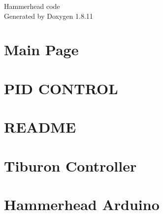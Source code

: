 \documentclass[twoside]{book}
\newcommand{\+}{\discretionary{\mbox{\scriptsize$\hookleftarrow$}}{}{}}
\newcommand{\clearemptydoublepage}{%
  \newpage{\pagestyle{empty}\cleardoublepage}%
}
\begin{document}
\hypersetup{pageanchor=false,
             bookmarksnumbered=true,
             pdfencoding=unicode
            }
\begin{titlepage}
\vspace*{7cm}
\begin{center}%
{\Large Hammerhead code }\\
\vspace*{1cm}
{\large Generated by Doxygen 1.8.11}\\
\end{center}
\end{titlepage}
\clearemptydoublepage
\tableofcontents
\clearemptydoublepage
{}
\hypersetup{pageanchor=true}

\chapter{Main Page}
\label{index}\hypertarget{index}{}
\chapter{P\+ID C\+O\+N\+T\+R\+OL}
\label{md_src_hammerhead_control_stack_pid_controller_README}
\hypertarget{md_src_hammerhead_control_stack_pid_controller_README}{}

\chapter{R\+E\+A\+D\+ME}
\label{md_src_hammerhead_control_stack_thruster_controller_config_README}
\hypertarget{md_src_hammerhead_control_stack_thruster_controller_config_README}{}

\chapter{Tiburon Controller}
\label{md_src_hammerhead_control_stack_tiburon_commander_README}
\hypertarget{md_src_hammerhead_control_stack_tiburon_commander_README}{}

\chapter{Hammerhead Arduino}
\label{md_src_hammerhead_hardware_stack_hammerhead_arduino_README}
\hypertarget{md_src_hammerhead_hardware_stack_hammerhead_arduino_README}{}

\end{document}
